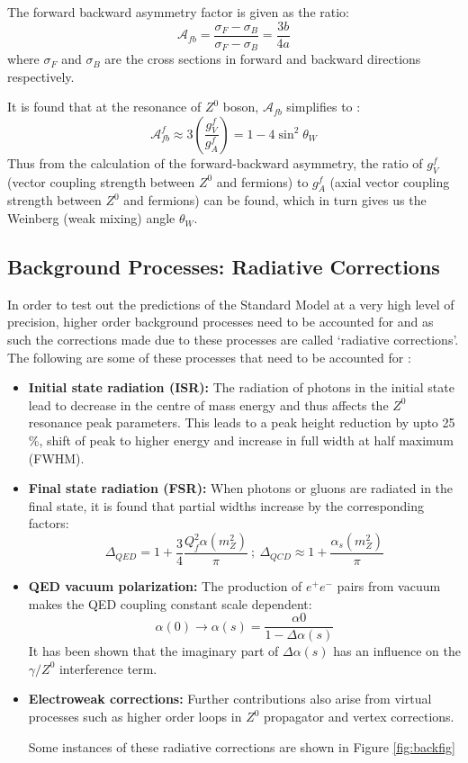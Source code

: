The forward backward asymmetry factor is given as the ratio:
\begin{equation}
\mathcal{A}_{fb}=\dfrac{\sigma_{F}-\sigma_{B}}{\sigma_{F}-\sigma_{B}}=\dfrac{3b}{4a}
\end{equation}
where $\sigma_{F}$ and $\sigma_{B}$ are the cross sections in forward and backward directions respectively.

It is found that at the resonance of $Z^{0}$ boson, $\mathcal{A}_{fb}$ simplifies to \cite{UB}:
\begin{equation}
\label{eqn:Weinbergangle}
\mathcal{A}_{fb}^{f}\approx 3\left(\dfrac{g_{V}^{f}}{g_{A}^{f}}\right)=1-4\sin^{2}\theta_{W} 
\end{equation}
Thus from the calculation of the forward-backward asymmetry, the ratio of $g_{V}^{f}$ (vector coupling strength between $Z^{0}$ and fermions) to $g_{A}^{f}$ (axial vector coupling strength between $Z^{0}$ and fermions) can be found, which in turn gives us the Weinberg (weak mixing) angle $\theta_{W}$.
\subsection{Background Processes: Radiative Corrections}
In order to test out the predictions of the Standard Model at a very high level of precision, higher order background processes need to be accounted for and as such the corrections made due to these processes are called `radiative corrections'. The following are some of these processes that need to be accounted for \cite{Zedometry}:
\begin{itemize}
\item \textbf{Initial state radiation (ISR):} The radiation of photons in the initial state lead to decrease in the centre of mass energy and thus affects the $Z^{0}$ resonance peak parameters. This leads to a peak height reduction by upto 25 \%, shift of peak to higher energy and increase in full width at half maximum (FWHM). 
\item \textbf{Final state radiation (FSR):} When photons or gluons are radiated in the final state, it is found that partial widths increase by the corresponding factors:
\begin{equation}
\Delta_{QED}=1+\dfrac{3}{4}\dfrac{Q_{f}^{2}\alpha(m_{Z}^{2})}{\pi}\ ;\ \Delta_{QCD}\approx 1+\dfrac{\alpha_{s}(m_{Z}^{2})}{\pi}
\end{equation}
\item \textbf{QED vacuum polarization:} The production of $e^{+}e^{-}$ pairs from vacuum makes the QED coupling constant scale dependent: 
\begin{equation}
\alpha(0)\rightarrow \alpha(s)=\dfrac{\alpha{0}}{1-\Delta \alpha(s)}
\end{equation}
It has been shown that the imaginary part of $\Delta \alpha(s)$ has an influence on the $\gamma / Z^{0}$ interference term.
\item \textbf{Electroweak corrections:} Further contributions also arise from virtual processes such as higher order loops in $Z^{0}$ propagator and vertex corrections.


Some instances of these radiative corrections are shown in Figure \ref{fig:backfig}
\end{itemize}

